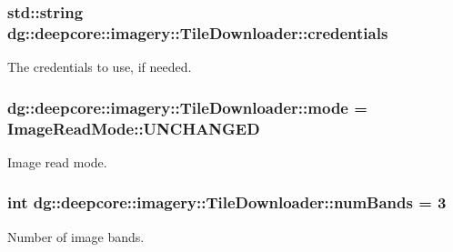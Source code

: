 \subsubsection[{\texorpdfstring{credentials}{credentials}}]{\setlength{\rightskip}{0pt plus 5cm}std\+::string dg\+::deepcore\+::imagery\+::\+Tile\+Downloader\+::credentials}\hypertarget{structdg_1_1deepcore_1_1imagery_1_1_tile_downloader_a129f882a4aecc3f2fee375d62c99fef8}{}\label{structdg_1_1deepcore_1_1imagery_1_1_tile_downloader_a129f882a4aecc3f2fee375d62c99fef8}


The credentials to use, if needed. 

\subsubsection[{\texorpdfstring{mode}{mode}}]{ dg\+::deepcore\+::imagery\+::\+Tile\+Downloader\+::mode = {\bf Image\+Read\+Mode\+::\+U\+N\+C\+H\+A\+N\+G\+ED}}\hypertarget{structdg_1_1deepcore_1_1imagery_1_1_tile_downloader_a33b7cac77d8a1690d08eda79fba5aae6}{}\label{structdg_1_1deepcore_1_1imagery_1_1_tile_downloader_a33b7cac77d8a1690d08eda79fba5aae6}


Image read mode. 

\subsubsection[{\texorpdfstring{num\+Bands}{numBands}}]{\setlength{\rightskip}{0pt plus 5cm}int dg\+::deepcore\+::imagery\+::\+Tile\+Downloader\+::num\+Bands = 3}\hypertarget{structdg_1_1deepcore_1_1imagery_1_1_tile_downloader_afd6c4c2baaa6dfe52a2f45a6e5bd64ef}{}\label{structdg_1_1deepcore_1_1imagery_1_1_tile_downloader_afd6c4c2baaa6dfe52a2f45a6e5bd64ef}


Number of image bands. 

